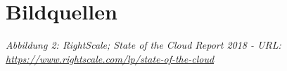 \section*{Bildquellen}
\small{\textit{Abbildung 2: RightScale; State of the Cloud Report 2018 - URL: \url{https://www.rightscale.com/lp/state-of-the-cloud}}}
